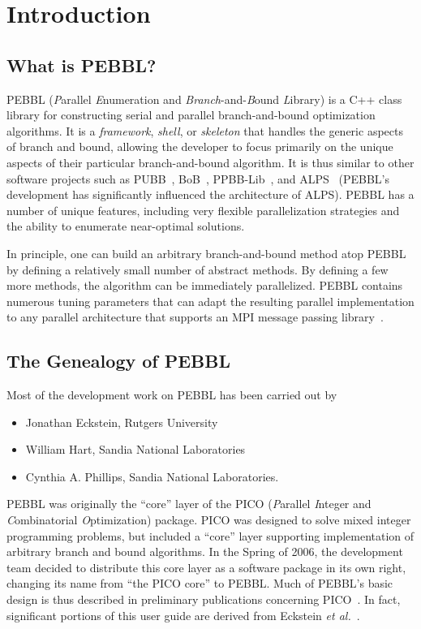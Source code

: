 \section{Introduction}


\subsection{What is PEBBL?}

PEBBL (\emph{P}arallel \emph{E}numeration and
\emph{Branch}-and-\emph{B}ound \emph{L}ibrary) is a C++ class library
for constructing serial and parallel branch-and-bound optimization
algorithms.  It is a \emph{framework}, \emph{shell}, or
\emph{skeleton} that handles the generic aspects of branch and bound,
allowing the developer to focus primarily on the unique aspects of
their particular branch-and-bound algorithm.  
It is thus similar to other software projects such
as PUBB~\cite{SHH95,SHH97}, BoB~\cite{bob95}, PPBB-Lib~\cite{PPBB96},
and ALPS~\cite{RLS04} (PEBBL's development has significantly
influenced the architecture of ALPS).  PEBBL has a number of unique
features, including very flexible parallelization strategies and the
ability to enumerate near-optimal solutions.

In principle, one can build an arbitrary branch-and-bound method atop
PEBBL by defining a relatively small number of abstract methods.  By
defining a few more methods, the algorithm can be immediately
parallelized.  PEBBL contains numerous tuning parameters that can
adapt the resulting parallel implementation to any parallel
architecture that supports an MPI message passing
library~\cite{SOHWD96}.


\subsection{The Genealogy of PEBBL}

Most of the development work on PEBBL has been carried out by
\begin{itemize}
\item Jonathan Eckstein, Rutgers University
\item William Hart, Sandia National Laboratories
\item Cynthia A. Phillips, Sandia National Laboratories.
\end{itemize}
PEBBL was originally the ``core''
layer of the PICO (\emph{P}arallel \emph{I}nteger and
\emph{C}ombina\-torial \emph{O}ptimization) package.  PICO was designed
to solve mixed integer programming problems, but included a ``core''
layer supporting implementation of arbitrary branch and bound
algorithms.  In the Spring of 2006, the development team decided to
distribute this core layer as a software package in its own right,
changing its name from ``the PICO core'' to PEBBL.  Much of PEBBL's
basic design is thus described in preliminary
publications concerning PICO~\cite{EHP97,EPH00,EPH00a}.  In fact,
significant portions of this user guide are derived
from Eckstein \emph{et al.}~\cite{EPH00a,EPH00}.

